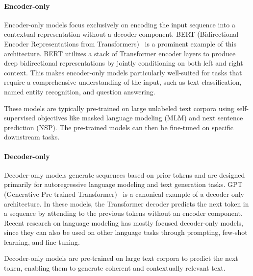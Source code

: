 \paragraph{Encoder-only}

Encoder-only models focus exclusively on encoding the input sequence into a contextual representation without a decoder component. BERT (Bidirectional Encoder Representations from Transformers)~\cite{devlin_bert_2019} is a prominent example of this architecture. BERT utilizes a stack of Transformer encoder layers to produce deep bidirectional representations by jointly conditioning on both left and right context. This makes encoder-only models particularly well-suited for tasks that require a comprehensive understanding of the input, such as text classification, named entity recognition, and question answering.

These models are typically pre-trained on large unlabeled text corpora using self-supervised objectives like masked language modeling (MLM) and next sentence prediction (NSP). The pre-trained models can then be fine-tuned on specific downstream tasks.

\paragraph{Decoder-only}

Decoder-only models generate sequences based on prior tokens and are designed primarily for autoregressive language modeling and text generation tasks. GPT (Generative Pre-trained Transformer)~\cite{radford_improving_2018} is a canonical example of a decoder-only architecture. In these models, the Transformer decoder predicts the next token in a sequence by attending to the previous tokens without an encoder component. Recent research on language modeling has mostly focused decoder-only models, since they can also be used on other language tasks through prompting, few-shot learning, and fine-tuning.

Decoder-only models are pre-trained on large text corpora to predict the next token, enabling them to generate coherent and contextually relevant text.

\bigskip

